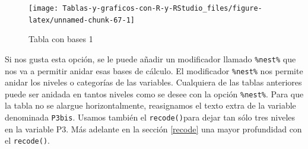 \documentclass[
]{book}
\newenvironment{Shaded}{\begin{snugshade}}{\end{snugshade}}
\newcommand{\AttributeTok}[1]{\textcolor[rgb]{0.77,0.63,0.00}{#1}}
\newcommand{\CommentTok}[1]{\textcolor[rgb]{0.56,0.35,0.01}{\textit{#1}}}
\newcommand{\DecValTok}[1]{\textcolor[rgb]{0.00,0.00,0.81}{#1}}
\newcommand{\FunctionTok}[1]{\textcolor[rgb]{0.00,0.00,0.00}{#1}}
\newcommand{\NormalTok}[1]{#1}
\newcommand{\OtherTok}[1]{\textcolor[rgb]{0.56,0.35,0.01}{#1}}
\newcommand{\SpecialCharTok}[1]{\textcolor[rgb]{0.00,0.00,0.00}{#1}}
\begin{document}
\begin{Shaded}
\end{Shaded}

\begin{figure}[H]

{\centering \texttt{[image: Tablas-y-graficos-con-R-y-RStudio\_files/figure-latex/unnamed-chunk-67-1]} 

}

\caption{Tabla con bases 1}\label{fig:unnamed-chunk-67}
\end{figure}

Si nos gusta esta opción, se le puede añadir un modificador llamado \texttt{\%nest\%} que nos va a permitir anidar esas bases de cálculo. El modificador \texttt{\%nest\%} nos permite anidar los niveles o categorías de las variables. Cualquiera de las tablas anteriores puede ser anidada en tantos niveles como se desee con la opción \texttt{\%nest\%}. Para que la tabla no se alargue horizontalmente, reasignamos el texto extra de la variable denominada \texttt{P3bis}. Usamos también el \texttt{recode()}para dejar tan sólo tres niveles en la variable P3. Más adelante en la sección \ref{recode} una mayor profundidad con el \texttt{recode()}.
\end{document}
